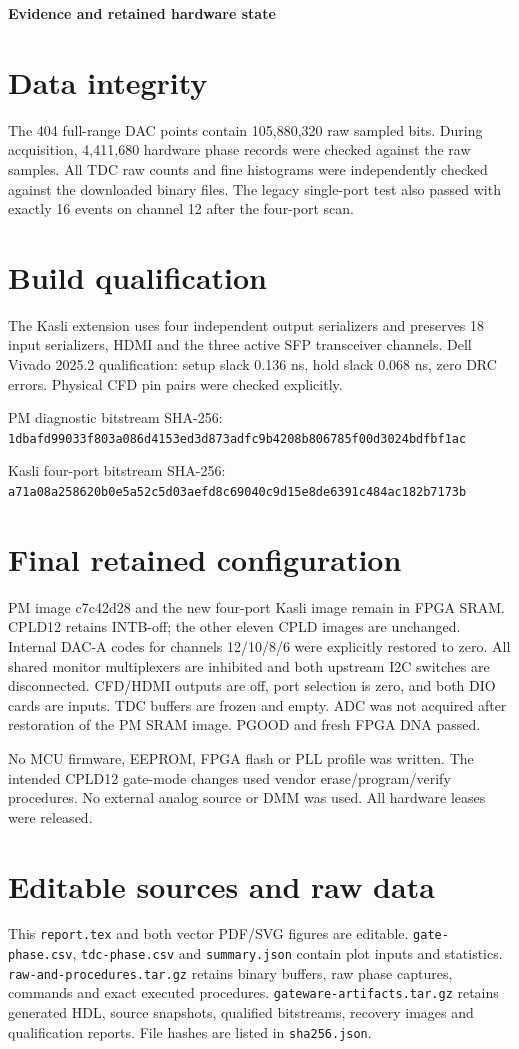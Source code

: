 \documentclass[11pt,a4paper]{article}
\begin{document}
\newpage
{\color{navy}\Large\bfseries Evidence and retained hardware state}\par
\section*{Data integrity}
The 404 full-range DAC points contain 105,880,320 raw sampled bits.
During acquisition, 4,411,680 hardware phase records were checked against the
raw samples. All TDC raw counts and fine histograms were independently checked
against the downloaded binary files. The legacy single-port test also passed
with exactly 16 events on channel 12 after the four-port scan.

\section*{Build qualification}
The Kasli extension uses four independent output serializers and preserves
18 input serializers, HDMI and the three active SFP transceiver channels.
Dell Vivado 2025.2 qualification: setup slack 0.136 ns, hold slack 0.068 ns,
zero DRC errors. Physical CFD pin pairs were checked explicitly.

PM diagnostic bitstream SHA-256:\\
\texttt{1dbafd99033f803a086d4153ed3d873adfc9b4208b806785f00d3024bdfbf1ac}

Kasli four-port bitstream SHA-256:\\
\texttt{a71a08a258620b0e5a52c5d03aefd8c69040c9d15e8de6391c484ac182b7173b}

\section*{Final retained configuration}
PM image c7c42d28 and the new four-port Kasli image remain in FPGA SRAM.
CPLD12 retains INTB-off; the other eleven CPLD images are unchanged.
Internal DAC-A codes for channels 12/10/8/6 were explicitly restored to zero.
All shared monitor multiplexers are inhibited and both upstream I2C switches
are disconnected. CFD/HDMI outputs are off, port selection is zero, and both
DIO cards are inputs. TDC buffers are frozen and empty. ADC was not acquired
after restoration of the PM SRAM image. PGOOD and fresh FPGA DNA passed.

No MCU firmware, EEPROM, FPGA flash or PLL profile was written. The intended
CPLD12 gate-mode changes used vendor erase/program/verify procedures.
No external analog source or DMM was used. All hardware leases were released.

\section*{Editable sources and raw data}
This \texttt{report.tex} and both vector PDF/SVG figures are editable.
\texttt{gate-phase.csv}, \texttt{tdc-phase.csv} and \texttt{summary.json} contain
plot inputs and statistics. \texttt{raw-and-procedures.tar.gz} retains binary
buffers, raw phase captures, commands and exact executed procedures.
\texttt{gateware-artifacts.tar.gz} retains generated HDL, source snapshots,
qualified bitstreams, recovery images and qualification reports.
File hashes are listed in \texttt{sha256.json}.
\end{document}
